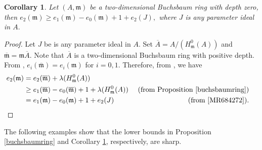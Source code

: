 \documentclass[11pt]{amsart}
\theoremstyle{plain}
\newtheorem{corollary}[theorem]{Corollary}
\newcommand{\m}{\mathfrak{m}}
\theoremstyle{plain}
\begin{document}
 \begin{corollary} \label{corobuch}
     Let $(A,\m)$ be a two-dimensional Buchsbaum ring with depth zero, then $e_{2}(\m)\geq e_{1}(\m)-e_{0}(\m)+1+e_{2}(J),$ where $J$ is any parameter ideal in $A.$
 \end{corollary}

 \begin{proof}
     Let  $J$ be is any parameter ideal in $A$.
     Set $\overline{A}=A/\left(H_{\mathfrak m}^{0}(A)\right)$  and   $ \overline{\m}=\m\overline{A}.$   Note that $\overline{A}$ is a two-dimensional Buchsbaum ring with positive depth. From \cite[Proposition 2.3]{rossi2010hilbert},  $e_{i}(\overline{\m})=e_{i}(\m)$ for $i=0,1.$ Therefore, from \cite[Proposition 2.3]{rossi2010hilbert}, we have
      \begin{align*}
       e_{2}(\m)&=e_{2}(\overline{\m})+\lambda(H_{\m}^{0}(A))\\
       &\geq e_{1}(\overline{\m})-e_{0}(\overline{\m})+1+\lambda(H_{\m}^{0}(A)) & \text{ (from Proposition \ref{buchsbaumring})}\\
       & = e_{1}(\m)-e_{0}(\m)+1+e_{2}(J) & \text{ (from \cite[Corollary 4.2]{MR684272})}.& \qedhere
      \end{align*}
 \end{proof} 
 The following examples show that the lower bounds in Proposition \ref{buchsbaumring} and Corollary \ref{corobuch}, respectively, are sharp.   
\end{document}
